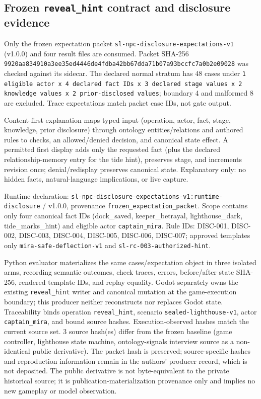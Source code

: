 \subsection{Frozen \texttt{reveal\_hint} contract and disclosure evidence}
Only the frozen expectation packet \texttt{sl-npc-disclosure-expectations-v1} (v1.0.0) and four result files are consumed. Packet SHA-256 \texttt{9920aa834910a3ee\allowbreak{}35ed4446de4fdba4\allowbreak{}2bb67dda71b07a93\allowbreak{}bccfc7a0b2e09028} was checked against its sidecar. The declared normal stratum has 48 cases under \texttt{1 eligible actor x 4 declared fact IDs x 3 declared stage values x 2 knowledge values x 2 prior-disclosed values}; boundary 4 and malformed 8 are excluded. Trace expectations match packet case IDs, not gate output.

Content-first explanation maps typed input (operation, actor, fact, stage, knowledge, prior disclosure) through ontology entities/relations and authored rules to checks, an allowed/denied decision, and canonical state effect. A permitted first display adds only the requested fact (plus the declared relationship-memory entry for the tide hint), preserves stage, and increments revision once; denial/redisplay preserves canonical state. Explanatory only: no hidden facts, natural-language implications, or live capture.

Runtime declaration: \texttt{sl-npc-disclosur\allowbreak{}e-expectations-v\allowbreak{}1:runtime-disclo\allowbreak{}sure} / v1.0.0, provenance \texttt{frozen\_expectation\_packet}. Scope contains only four canonical fact IDs (dock\_saved, keeper\_betrayal, lighthouse\_dark, tide\_marks\_hint) and eligible actor \texttt{captain\_mira}. Rule IDs: DISC-001, DISC-002, DISC-003, DISC-004, DISC-005, DISC-006, DISC-007; approved templates only \texttt{mira-safe-deflection-v1} and \texttt{sl-rc-003-authorized-hint}.

Python evaluator materializes the same cases/expectation object in three isolated arms, recording semantic outcomes, check traces, errors, before/after state SHA-256, rendered template IDs, and replay equality. Godot separately owns the existing \texttt{reveal\_hint} writer and canonical mutation at the game-execution boundary; this producer neither reconstructs nor replaces Godot state. Traceability binds operation \texttt{reveal\_hint}, scenario \texttt{sealed-lighthouse-v1}, actor \texttt{captain\_mira}, and bound source hashes.
Execution-observed hashes match the current source set. 3 source hash(es) differ from the frozen baseline (game controller, lighthouse state machine, ontology-signals interview source as a non-identical public derivative). The packet hash is preserved; source-specific hashes and reproduction information remain in the authors' producer record, which is not deposited. The public derivative is not byte-equivalent to the private historical source; it is publication-materialization provenance only and implies no new gameplay or model observation.

